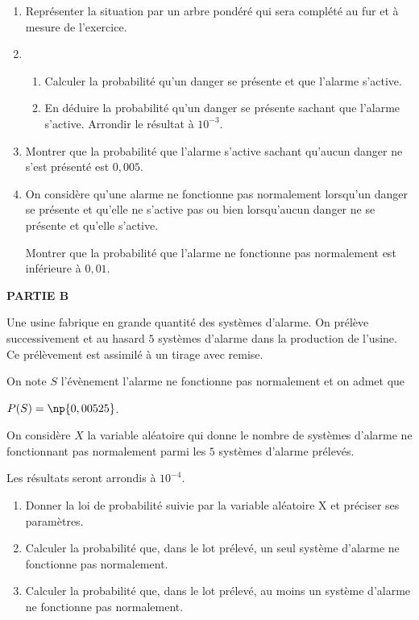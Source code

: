 \documentclass[11pt]{article}
\begin{document}
\begin{enumerate}
\item Représenter la situation par un arbre pondéré qui sera complété au fur et à mesure de l'exercice.
\item  
	\begin{enumerate}
		\item Calculer la probabilité qu'un danger se présente et que l'alarme s'active.
		\item En déduire la probabilité qu'un danger se présente sachant que l'alarme s'active.
Arrondir le résultat à $10^{-3}$.
	\end{enumerate}
\item  Montrer que la probabilité que l'alarme s'active sachant qu'aucun danger ne s'est présenté est $0,005$.
\item On considère qu'une alarme ne fonctionne pas normalement lorsqu'un danger se présente et qu'elle ne s'active pas ou bien lorsqu'aucun danger ne se présente et qu'elle s'active.

Montrer que la probabilité que l'alarme ne fonctionne pas normalement est inférieure à $0,01$.
\end{enumerate}

\medskip

\textbf{PARTIE B}

\medskip

Une usine fabrique en grande quantité des systèmes d'alarme. On prélève successivement et au hasard $5$ systèmes d'alarme dans la production de l'usine. Ce prélèvement est assimilé à un tirage avec remise.

On note $S$ l'évènement \og  l'alarme ne fonctionne pas normalement \fg{}  et on admet que

$P(S) = \np{0,00525}$.

On considère $X$ la variable aléatoire qui donne le nombre de systèmes d'alarme ne fonctionnant pas normalement parmi les $5$ systèmes d'alarme prélevés.

Les résultats seront arrondis à $10^{-4}$.

\medskip

\begin{enumerate}
\item Donner la loi de probabilité suivie par la variable aléatoire X et préciser ses paramètres.
\item Calculer la probabilité que, dans le lot prélevé, un seul système d'alarme ne fonctionne pas normalement.
\item Calculer la probabilité que, dans le lot prélevé, au moins un système d'alarme ne fonctionne pas normalement.
\end{enumerate}
\end{document}
